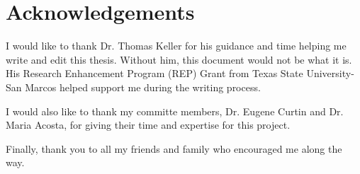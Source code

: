 \documentclass[main.tex]{subfiles}
\begin{document}
\chapter{Acknowledgements}

I would like to thank Dr. Thomas Keller for his guidance and time helping me write and edit this thesis. Without him, this document would not be what it is. His Research Enhancement Program (REP) Grant from Texas State University-San Marcos helped support me during the writing process.

I would also like to thank my committe members, Dr. Eugene Curtin and Dr. Maria Acosta, for giving their time and expertise for this project.

Finally, thank you to all my friends and family who encouraged me along the way.
\end{document}
